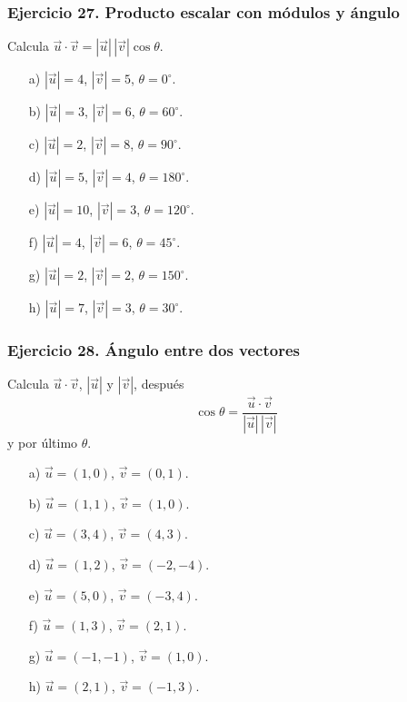 \subsubsection*{Ejercicio 27. Producto escalar con módulos y ángulo}

Calcula $\vec{u}\cdot\vec{v}=|\vec{u}|\,|\vec{v}|\cos\theta$.

\begin{enumerate}
    \item[a)] $|\vec{u}|=4$, $|\vec{v}|=5$, $\theta=0^\circ$.
    \item[b)] $|\vec{u}|=3$, $|\vec{v}|=6$, $\theta=60^\circ$.
    \item[c)] $|\vec{u}|=2$, $|\vec{v}|=8$, $\theta=90^\circ$.
    \item[d)] $|\vec{u}|=5$, $|\vec{v}|=4$, $\theta=180^\circ$.
    \item[e)] $|\vec{u}|=10$, $|\vec{v}|=3$, $\theta=120^\circ$.
    \item[f)] $|\vec{u}|=4$, $|\vec{v}|=6$, $\theta=45^\circ$.
    \item[g)] $|\vec{u}|=2$, $|\vec{v}|=2$, $\theta=150^\circ$.
    \item[h)] $|\vec{u}|=7$, $|\vec{v}|=3$, $\theta=30^\circ$.
\end{enumerate}

\subsubsection*{Ejercicio 28. Ángulo entre dos vectores}

Calcula $\vec{u}\cdot\vec{v}$, $|\vec{u}|$ y $|\vec{v}|$, después
\[
\cos\theta=\frac{\vec{u}\cdot\vec{v}}{|\vec{u}|\,|\vec{v}|}
\]
y por último $\theta$.

\begin{enumerate}
    \item[a)] $\vec{u}=(1,0)$, $\vec{v}=(0,1)$.
    \item[b)] $\vec{u}=(1,1)$, $\vec{v}=(1,0)$.
    \item[c)] $\vec{u}=(3,4)$, $\vec{v}=(4,3)$.
    \item[d)] $\vec{u}=(1,2)$, $\vec{v}=(-2,-4)$.
    \item[e)] $\vec{u}=(5,0)$, $\vec{v}=(-3,4)$.
    \item[f)] $\vec{u}=(1,3)$, $\vec{v}=(2,1)$.
    \item[g)] $\vec{u}=(-1,-1)$, $\vec{v}=(1,0)$.
    \item[h)] $\vec{u}=(2,1)$, $\vec{v}=(-1,3)$.
\end{enumerate}

